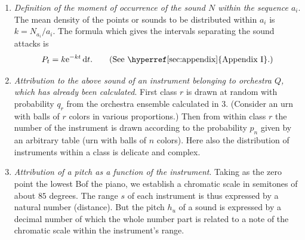 \documentclass[letterpaper, 11pt]{article}
\begin{document}
\begin{enumerate}
        Fig.\ V-2 is expressed by the formula
        \[ Q_r = (n-x)(e_{n,r} - e_{n+1,r}) + e_{n,r} \]
        in which \( r = \) the number of the class,
        \( x = \log_\mathrm{e}{\left[(\mathrm{DA})_i/(\mathrm{V}3)\right]} \),
        \( n = 0, 1, 2, \dots, R \), such that \( n \leq x \leq n + 1 \), and \( e_{n,r} \) and
        \( e_{n+1,r} \) are the probabilities of class \( r \) as a function of \( n \). It goes
        without saying that the composition of this table is a precise task of great complexity and
        delicacy. Once these preliminaries have been completed, we can define, one after the other,
        the \( N_{a_i} \) sounds of sequence \( a_i \).
    \item
        \textit{Definition of the moment of occurrence of the sound \( N \) within the sequence
        \( a_i \)}. The mean density of the points or sounds to be distributed within \( a_i \) is
        \( k = N_{a_i} / a_i \). The formula which gives the intervals separating the sound attacks
        is
        \[
            P_t = k \mathrm{e}^{-kt} \, \mathrm{d}t.
            \tag{See \hyperref[sec:appendix]{Appendix I}.}
        \]
    \item
        \textit{Attribution to the above sound of an instrument belonging to orchestra \( Q \),
        which has already been calculated}. First class \( r \) is drawn at random with probability
        \( q_r \) from the orchestra ensemble calculated in 3. (Consider an urn with balls of 
        \( r \) colors in various proportions.) Then from within class \( r \) the number of the
        instrument is drawn according to the probability \( p_n \) given by an arbitrary table (urn
        with balls of \( n \) colors). Here also the distribution of instruments within a class is
        delicate and complex.
    \item
        \textit{Attribution of a pitch as a function of the instrument}. Taking as the zero point
        the lowest B\hspace{0.1em}\flat of the piano, we establish a chromatic scale in semitones of
        about \( 85 \) degrees. The range \( s \) of each instrument is thus expressed by a natural
        number (distance). But the pitch \( h_u \) of a sound is expressed by a decimal number of
        which the whole number part is related to a note of the chromatic scale within the
        instrument's range.


\end{enumerate}
\end{document}
